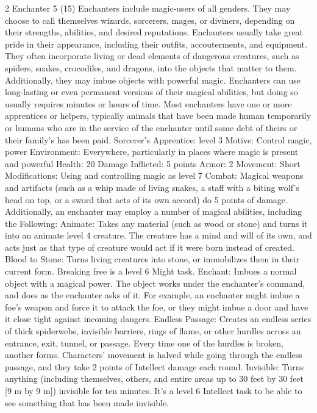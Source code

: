 \begin{multicols}{2}
Enchanter 5 (15)
Enchanters include magic-users of all genders. They may choose to call themselves wizards, sorcerers, mages, or diviners, depending on their strengths, abilities, and desired reputations.
Enchanters usually take great pride in their appearance, including their outfits, accouterments, and equipment. They often incorporate living or dead elements of dangerous creatures, such as spiders, snakes, crocodiles, and dragons, into the objects that matter to them. Additionally, they may imbue objects with powerful magic.
Enchanters can use long-lasting or even permanent versions of their magical abilities, but doing so usually requires minutes or hours of time.
Most enchanters have one or more apprentices or helpers, typically animals that have been made human temporarily or humans who are in the service of the enchanter until some debt of theirs or their family’s has been paid.
Sorcerer’s Apprentice: level 3
Motive: Control magic, power
Environment: Everywhere, particularly in places where magic is present and powerful Health: 20
Damage Inflicted: 5 points
Armor: 2
Movement: Short
Modifications: Using and controlling magic as level 7
Combat: Magical weapons and artifacts (such as a whip made of living snakes, a staff with a
biting wolf’s head on top, or a sword that acts of its own accord) do 5 points of damage. Additionally, an enchanter may employ a number of magical abilities, including the
Following:
Animate: Takes any material (such as wood or stone) and turns it into an animate level
4 creature. The creature has a mind and will of its own, and acts just as that type of
creature would act if it were born instead of created.
Blood to Stone: Turns living creatures into stone, or immobilizes them in their current form. Breaking free is a level 6 Might task.
Enchant: Imbues a normal object with a magical power. The object works under the
enchanter’s command, and does as the enchanter asks of it. For example, an enchanter might imbue a foe’s weapon and force it to attack the foe, or they might imbue a door and have it close tight against incoming dangers.
Endless Passage: Creates an endless series of thick spiderwebs, invisible barriers, rings of flame, or other hurdles across an entrance, exit, tunnel, or passage. Every time one of the hurdles is broken, another forms. Characters’ movement is halved while going through the endless passage, and they take 2 points of Intellect damage each round.
Invisible: Turns anything (including themselves, others, and entire areas up to 30 feet by 30 feet [9 m by 9 m]) invisible for ten minutes. It’s a level 6 Intellect task to be able to see something that has been made invisible.

\end{multicols}
